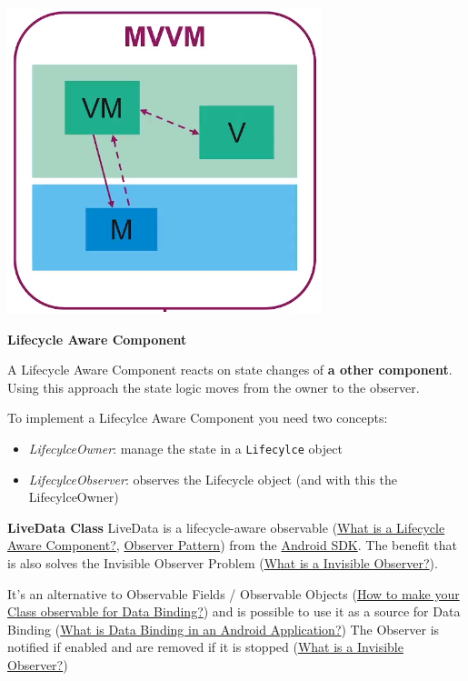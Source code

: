 \documentclass[11pt,twoside,landscape]{article}
\begin{document}
\begin{multicols}{3}
\begin{center}
\includegraphics[width=.9\linewidth]{img/mvvm.png}
\end{center}


\textbf{Lifecycle Aware Component}

A Lifecycle Aware Component reacts on state changes of \textbf{a other component}.
Using this approach the state logic moves from the owner to the observer.

To implement a Lifecylce Aware Component you need two concepts:
\begin{itemize}
\item \emph{LifecylceOwner}: manage the state in a \texttt{Lifecylce} object
\item \emph{LifecylceObserver}: observes the Lifecycle object (and with this the LifecylceOwner)
\end{itemize}


\textbf{LiveData Class}
LiveData is a lifecycle-aware observable (\href{../../../roam/20211112114814-what_is_a_lifecycle_aware_component.org}{What is a Lifecycle Aware Component?}, \href{../../../roam/20211103140808-observer_pattern.org}{Observer Pattern}) from the \href{../../../roam/20210928175951-android_sdk.org}{Android SDK}.
The benefit that is also solves the Invisible Observer Problem (\href{../../../roam/20211112110032-what_is_a_invisible_observer.org}{What is a Invisible Observer?}).

It's an alternative to Observable Fields / Observable Objects (\href{../../../roam/20211112103257-how_to_make_your_class_observable_for_data_binding.org}{How to make your Class observable for Data Binding?}) and is possible to use it as a source for Data Binding (\href{../../../roam/20211112100504-what_is_data_binding_in_an_android_application.org}{What is Data Binding in an Android Application?})
The Observer is notified if enabled and are removed if it is stopped (\href{../../../roam/20211112110032-what_is_a_invisible_observer.org}{What is a Invisible Observer?})
\end{multicols}
\end{document}
